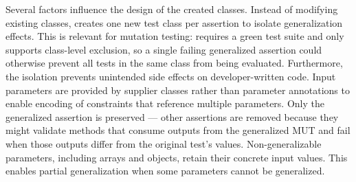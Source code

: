 Several factors influence the design of the created classes.
Instead of modifying existing classes,
\ToolTeralizer{} creates one new test class per assertion
to isolate generalization effects.
This is relevant for mutation testing:
\ToolPit{} requires a green test suite and only supports class-level exclusion,
so a single failing generalized assertion
could otherwise prevent all tests in the same class from being evaluated.
Furthermore, the isolation prevents unintended side effects on developer-written code.
Input parameters are provided by supplier classes rather than parameter annotations
to enable encoding of constraints that reference multiple parameters.
Only the generalized assertion is preserved ---
other assertions are removed because they might validate methods
that consume outputs from the generalized MUT
and fail when those outputs differ from the original test's values.
Non-generalizable parameters, including arrays and objects,
retain their concrete input values.
This enables partial generalization when
some parameters cannot be generalized.

